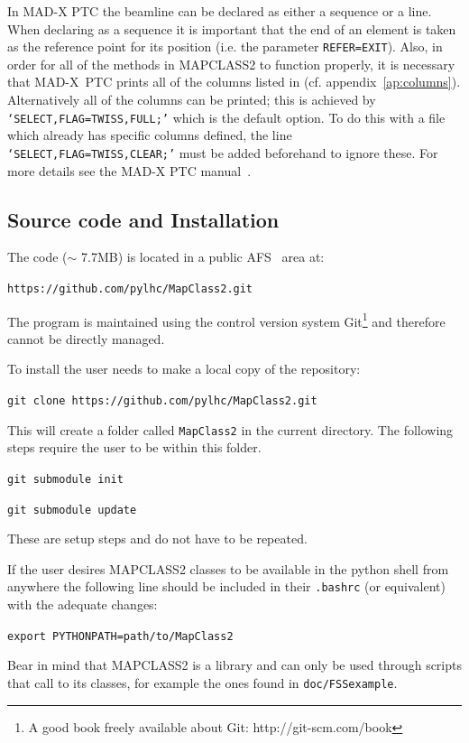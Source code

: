 \documentclass[a4paper]{cernatsnote}
\begin{document}
In \textsc{MAD-X PTC} the beamline can be declared as either a sequence
or a line. When declaring as a sequence it is important that the end
of an element is taken as the reference point for its position (i.e. the
parameter \texttt{REFER=EXIT}). Also, in order for all of the methods in
\textsc{MAPCLASS2} to function properly, it is necessary that MAD-X~PTC
prints all of the columns listed in (cf. appendix~\ref{ap:columns}).
Alternatively all of the columns can be printed; this is achieved by
\texttt{`SELECT,FLAG=TWISS,FULL;'} which is the default option. To do
this with a file which already has specific columns defined, the line
\texttt{`SELECT,FLAG=TWISS,CLEAR;'} must be added beforehand to ignore
these. For more details see the \textsc{MAD-X PTC} manual~\cite{madx}.

\subsection{Source code and Installation}
\def \codelocation {https://github.com/pylhc/MapClass2.git}

The code ($\sim$ 7.7MB) is located in a public AFS~\cite{afs} area at:

\texttt{\codelocation}

The program is maintained using the control version system
Git\footnote{A good book freely available about Git: http://git-scm.com/book}
\cite{git} and therefore cannot be directly managed.

To install the user needs to make a local copy of the repository:

\texttt{git clone \codelocation}

This will create a folder called \texttt{MapClass2} in the current
directory. The following steps require the user to be within this
folder.

\texttt{git submodule init}

\texttt{git submodule update}

These are setup steps and do not have to be repeated.

If the user desires \textsc{MAPCLASS2} classes to be available in the
python shell from anywhere the following line should be included in
their \texttt{.bashrc} (or equivalent) with the adequate changes:

\texttt{export PYTHONPATH=path/to/MapClass2}

Bear in mind that \textsc{MAPCLASS2} is a library and can only be used
through scripts that call to its classes, for example the ones found
in \texttt{doc/FSSexample}.
\end{document}
